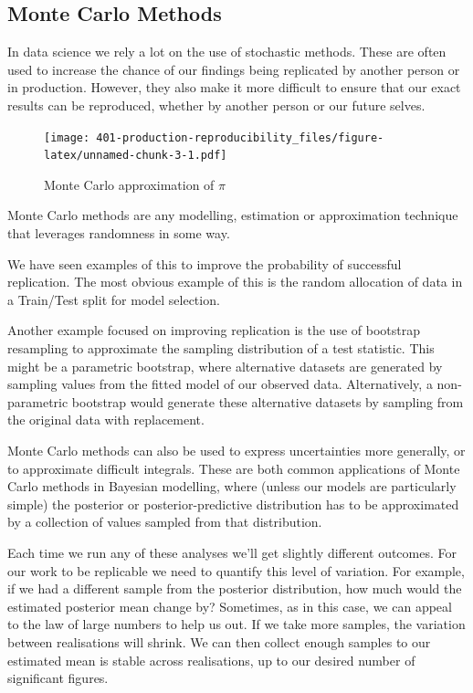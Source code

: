 \documentclass[
  12pt,
]{book}
\begin{document}
\hypertarget{monte-carlo-methods}{%
\subsection{Monte Carlo Methods}\label{monte-carlo-methods}}

In data science we rely a lot on the use of stochastic methods. These are often used to increase the chance of our findings being replicated by another person or in production. However, they also make it more difficult to ensure that our exact results can be reproduced, whether by another person or our future selves.

\begin{figure}
\centering
\texttt{[image: 401-production-reproducibility\_files/figure-latex/unnamed-chunk-3-1.pdf]}
\caption{\label{fig:unnamed-chunk-3}Monte Carlo approximation of \(\pi\)}
\end{figure}

Monte Carlo methods are any modelling, estimation or approximation technique that leverages randomness in some way.

We have seen examples of this to improve the probability of successful replication. The most obvious example of this is the random allocation of data in a Train/Test split for model selection.

Another example focused on improving replication is the use of bootstrap resampling to approximate the sampling distribution of a test statistic. This might be a parametric bootstrap, where alternative datasets are generated by sampling values from the fitted model of our observed data. Alternatively, a non-parametric bootstrap would generate these alternative datasets by sampling from the original data with replacement.

Monte Carlo methods can also be used to express uncertainties more generally, or to approximate difficult integrals. These are both common applications of Monte Carlo methods in Bayesian modelling, where (unless our models are particularly simple) the posterior or posterior-predictive distribution has to be approximated by a collection of values sampled from that distribution.

Each time we run any of these analyses we'll get slightly different outcomes. For our work to be replicable we need to quantify this level of variation. For example, if we had a different sample from the posterior distribution, how much would the estimated posterior mean change by? Sometimes, as in this case, we can appeal to the law of large numbers to help us out. If we take more samples, the variation between realisations will shrink. We can then collect enough samples to our estimated mean is stable across realisations, up to our desired number of significant figures.
\end{document}
